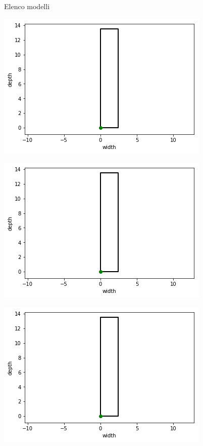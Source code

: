 \documentclass{beamer}
\begin{document}
\begin{frame}{Elenco modelli}
	\begin{minipage}[c]{0.45\textwidth}
		\includegraphics[width=\textwidth]{figures/cartesian_wd}
	\end{minipage}
	\hfill
	\begin{minipage}[c]{0.45\textwidth}
		\includegraphics[width=\textwidth]{figures/cartesian_wd}
	\end{minipage}
	\begin{minipage}[c]{0.45\textwidth}
		\includegraphics[width=\textwidth]{figures/cartesian_wd}

\end{minipage}
\end{frame}
\end{document}
